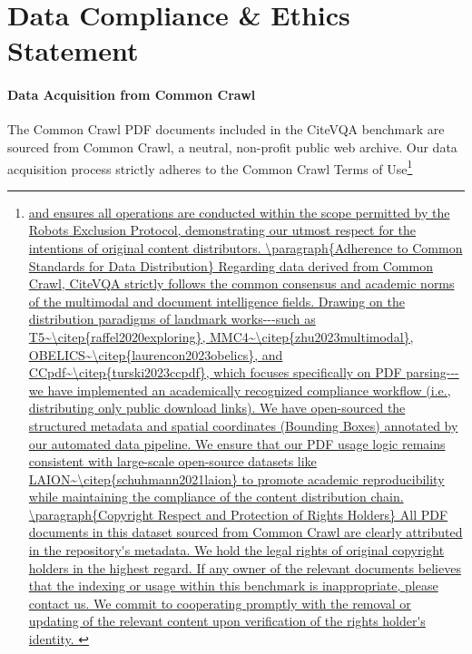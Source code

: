 \documentclass[]{opendatalab}
\begin{document}
{\clearpage
\newpage
{\small


}

\clearpage
\newpage
\beginappendix

\section{Data Compliance \& Ethics Statement}
\label{Appendix: Ethical Consideration}
\paragraph{Data Acquisition from Common Crawl} The Common Crawl PDF documents included in the CiteVQA benchmark are sourced from Common Crawl, a neutral, non-profit public web archive. Our data acquisition process strictly adheres to the Common Crawl Terms of Use\footnote{\url{ and ensures all operations are conducted within the scope permitted by the Robots Exclusion Protocol, demonstrating our utmost respect for the intentions of original content distributors.

\paragraph{Adherence to Common Standards for Data Distribution}
Regarding data derived from Common Crawl, CiteVQA strictly follows the common consensus and academic norms of the multimodal and document intelligence fields. Drawing on the distribution paradigms of landmark works---such as T5~\citep{raffel2020exploring}, MMC4~\citep{zhu2023multimodal}, OBELICS~\citep{laurencon2023obelics}, and CCpdf~\citep{turski2023ccpdf}, which focuses specifically on PDF parsing---we have implemented an academically recognized compliance workflow (i.e., distributing only public download links).

We have open-sourced the structured metadata and spatial coordinates (Bounding Boxes) annotated by our automated data pipeline. We ensure that our PDF usage logic remains consistent with large-scale open-source datasets like LAION~\citep{schuhmann2021laion} to promote academic reproducibility while maintaining the compliance of the content distribution chain.

\paragraph{Copyright Respect and Protection of Rights Holders} All PDF documents in this dataset sourced from Common Crawl are clearly attributed in the repository's metadata. We hold the legal rights of original copyright holders in the highest regard. If any owner of the relevant documents believes that the indexing or usage within this benchmark is inappropriate, please contact us. We commit to cooperating promptly with the removal or updating of the relevant content upon verification of the rights holder's identity.

}}}
\end{document}
